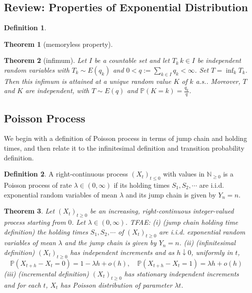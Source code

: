 \documentclass{article}
\newtheorem{Thm}{Theorem}[section]
\theoremstyle{definition}
\newtheorem{Def}{Definition}[section]
\newcommand{\PP}{\mathbb{P}}
\renewcommand{\leq}{\leqslant}
\renewcommand{\geq}{\geqslant}
\newcommand{\<}{\left\langle}
\renewcommand{\>}{\right\rangle}
\begin{document}
\subsection{Review: Properties of Exponential Distribution}
\begin{Def}
    
\end{Def}
\begin{Thm}[memoryless property]
    
\end{Thm}
\begin{Thm}[infimum]
    Let $I$ be a countable set and let $T_k\,k\in I$ be independent random variables with $T_k \sim E(q_k)$ and $0 < q := \sum_{k\in I} q_k < \infty$. 
    Set $T = \inf_k T_k$. Then this infimum is attained at a unique random value $K$ of $k$ a.s.. Moreover, $T$ and $K$ are independent, with $T \sim E(q)$ and $\PP(K = k) = \frac{q_k}{q}$.

\end{Thm}

\subsection{Poisson Process}

We begin with a definition of Poisson process in terms of jump chain and holding times, and then relate it to
the infinitesimal definition and transition probability definition.
\begin{Def}
    A right-continuous process $(X_t)_{t\leq 0}$ with values in $\mathbb{N}_{\geq 0}$ is a Poisson process of rate $\lambda\in (0,\infty)$
    if its holding times $S_1,S_2,\cdots$ are i.i.d. exponential random variables of mean $\lambda$ and its jump chain is given by $Y_n=n$.
\end{Def}

\begin{Thm}
    Let $(X_t)_{t\geq 0}$ be an increasing, right-continuous integer-valued process starting from $0$. Let $\lambda\in(0,\infty)$. TFAE:\newline 
    (i) (jump chain holding time definition) the holding times $S_1,S_2,\cdots$ of $(X_t)_{t\geq 0}$ are i.i.d. exponential random variables of mean $\lambda$ 
    and the jump chain is given by $Y_n=n$.\newline 
    (ii) (infinitesimal definition) $(X_t)_{t\geq 0}$ has independent increments and as $h\downarrow 0$, uniformly in $t$,
    \[\PP(X_{t+h}-X_t=0)=1-\lambda h+o(h),\quad \PP(X_{t+h}-X_t=1)=\lambda h+o(h)\]\newline 
    (iii) (incremental definition) $(X_t)_{t\geq 0}$ has stationary independent increments and for each $t$, $X_t$ has Poisson distribution of parameter $\lambda t$.
\end{Thm}
\end{document}
